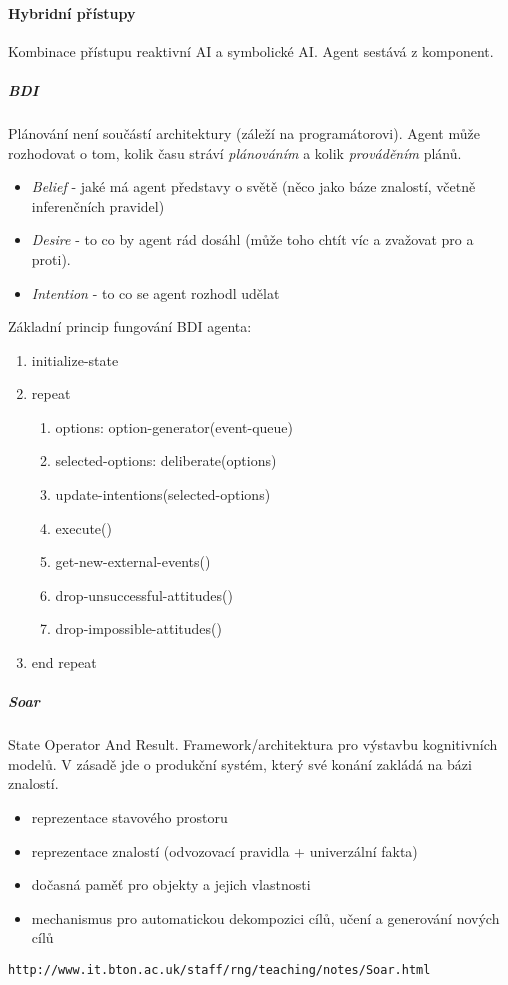 \documentclass[a4paper]{article}      %
\begin{document}
\paragraph{Hybridní přístupy}
Kombinace přístupu reaktivní AI a symbolické AI. Agent sestává z komponent.
\subparagraph{BDI}
Plánování není součástí architektury (záleží na programátorovi).
Agent může rozhodovat o tom, kolik času stráví \emph{plánováním} a kolik \emph{prováděním} plánů.
\begin{itemize}
\item \emph{Belief} - jaké má agent představy o světě (něco jako báze znalostí, včetně inferenčních pravidel)
\item \emph{Desire} - to co by agent rád dosáhl (může toho chtít víc a zvažovat pro a proti).
\item \emph{Intention} - to co se agent rozhodl udělat
\end{itemize}
Základní princip fungování BDI agenta:
\begin{enumerate}
\item initialize-state
\item repeat
	\begin{enumerate}
	\item options: option-generator(event-queue)
	\item selected-options: deliberate(options)
	\item update-intentions(selected-options)
	\item execute()
	\item get-new-external-events()
	\item drop-unsuccessful-attitudes()
	\item drop-impossible-attitudes()
	\end{enumerate}
\item end repeat
\end{enumerate}

\subparagraph{Soar}
State Operator And Result. Framework/architektura pro výstavbu kognitivních modelů.
V zásadě jde o produkční systém, který své konání zakládá na bázi znalostí.
\begin{itemize}
\item reprezentace stavového prostoru
\item reprezentace znalostí (odvozovací pravidla + univerzální fakta)
\item dočasná paměť pro objekty a jejich vlastnosti
\item mechanismus pro automatickou dekompozici cílů, učení a generování nových cílů
\end{itemize}
\verb+http://www.it.bton.ac.uk/staff/rng/teaching/notes/Soar.html+
\end{document}
